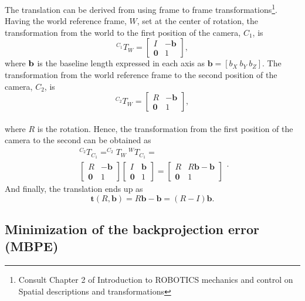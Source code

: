 The translation can be derived from using frame to frame transformations\footnote{Consult Chapter 2 of Introduction to ROBOTICS mechanics and control \cite{robotics} on Spatial descriptions and transformations}. Having the world reference frame, ${W}$, set at the center of rotation, the transformation from the world to the first position of the camera, ${C_1}$, is
\begin{equation}
^{C_1}T_{W} = \begin{bmatrix}
I & -\mathbf{b}\\ 
\mathbf{0} & 1
\end{bmatrix},
\end{equation} 
where $\bf b$ is the baseline length expressed in each axis as $\mathbf{b} = [b_X \ b_Y \ b_Z]$. 
The transformation from the world reference frame to the second position of the camera, ${C_2}$, is
\begin{equation}
^{C_2}T_{W} = \begin{bmatrix}
R & -\mathbf{b}\\ 
\mathbf{0} & 1
\end{bmatrix},
\end{equation}\\
where $R$ is the rotation.
Hence, the transformation from the first position of the camera to the second can be obtained as
\begin{equation}
\begin{split}
^{C_2}T_{C_1} = ^{C_2}T_W  \ ^WT_{C_1} =\\
\begin{bmatrix}
R & -\mathbf{b}\\ 
\mathbf{0} & 1
\end{bmatrix}
\begin{bmatrix}
I & \mathbf{b}\\ 
\mathbf{0} & 1
\end{bmatrix}
=
\begin{bmatrix}
R & R\mathbf{b}-\mathbf{b}\\ 
\mathbf{0} & 1
\end{bmatrix}
\end{split}.
\end{equation}
And finally, the translation ends up as
\begin{equation}
\mathbf{t}(R, \mathbf{b}) = R\mathbf{b}-\mathbf{b} = (R-I)\mathbf{b}.
\end{equation}

\subsection{Minimization of the backprojection error (MBPE)}

